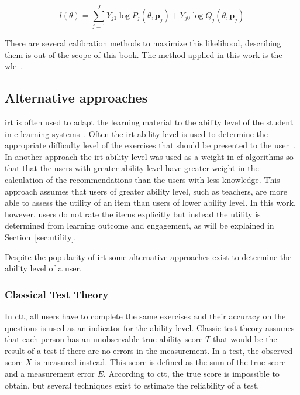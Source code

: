 \begin{equation}
    \label{eq:wle3}
    l(\theta) = \sum_{j=1}^{J} Y_{j1} \log P_{j}(\theta, \bm{p}_j) + Y_{j0} \log Q_{j}(\theta, \bm{p}_j)
\end{equation}

There are several calibration methods to maximize this likelihood, describing them is out of the scope of this book. 
The method applied in this work is the \gls{wle}~\cite{magis2017computerized}.

\subsection{Alternative approaches}
\gls{irt} is often used to adapt the learning material to the ability level of the student in e-learning systems~\cite{chen2005personalized,yarandi2011personalised}.
Often the \gls{irt} ability level is used to determine the appropriate difficulty level of the exercises that should be presented to the user~\cite{chen2005personalized,yarandi2011personalised,khanal2020systematic}.
In another approach the \gls{irt} ability level was used as a weight in \gls{cf} algorithms so that that the users with greater ability level have greater weight in the calculation of the recommendations than the users with less knowledge.
This approach assumes that users of greater ability level, such as teachers, are more able to assess the utility of an item than users of lower ability level.
In this work, however, users do not rate the items explicitly but instead the utility is determined from learning outcome and engagement, as will be explained in Section~\ref{sec:utility}.

Despite the popularity of \gls{irt} some alternative approaches exist to determine the ability level of a user.

\subsubsection{Classical Test Theory}
In \gls{ctt}, all users have to complete the same exercises and their accuracy on the questions is used as an indicator for the ability level.
Classic test theory assumes that each person has an unobservable true ability score $T$ that would be the result of a test if there are no errors in the measurement.
In a test, the observed score $X$ is measured instead.
This score is defined as the sum of the true score and a measurement error $E$.
According to \gls{ctt}, the true score is impossible to obtain, but several techniques exist to estimate the reliability of a test.

